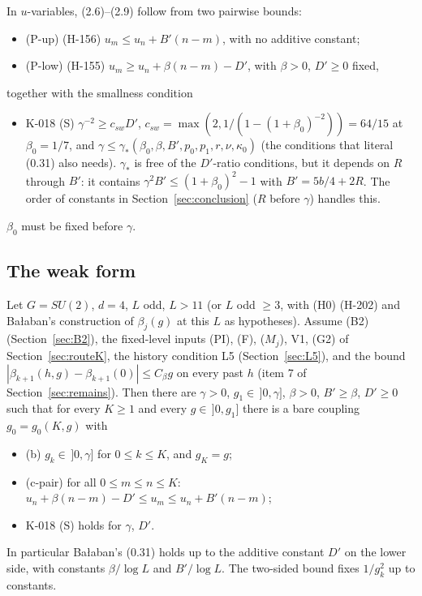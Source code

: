 In $u$-variables, (2.6)--(2.9) follow from two pairwise bounds:
\begin{itemize}
\item (P-up) (H-156) $u_m \le u_n + B'(n-m)$, with no additive constant;
\item (P-low) (H-155) $u_m \ge u_n + \beta(n-m) - D'$, with $\beta>0$, $D'\ge 0$ fixed,
\end{itemize}
together with the smallness condition
\begin{itemize}
\item K-018 (S) $\gamma^{-2} \ge c_{sw} D'$, $c_{sw} = \max(2, 1/(1-(1+\beta_0)^{-2})) = 64/15$ at $\beta_0 = 1/7$, and $\gamma \le \gamma_*(\beta_0,\beta,B',p_0,p_1,r,\nu,\kappa_0)$ (the conditions that literal (0.31) also needs). $\gamma_*$ is free of the $D'$-ratio conditions, but it depends on $R$ through $B'$: it contains $\gamma^2B' \le (1+\beta_0)^2 - 1$ with $B' = 5b/4 + 2R$. The order of constants in Section~\ref{sec:conclusion} ($R$ before $\gamma$) handles this.
\end{itemize}
$\beta_0$ must be fixed before $\gamma$.

\subsection{The weak form}\label{sec:2w}

\begin{theorem}\label{thm:L001}
Let $G = SU(2)$, $d=4$, $L$ odd, $L>11$ (or $L$ odd $\ge 3$, with (H0) (H-202) and Ba{\l}aban's construction of $\beta_j(g)$ at this $L$ as hypotheses). Assume (B2) (Section~\ref{sec:B2}), the fixed-level inputs (PI), (F), ($M_j$), V1, (G2) of Section~\ref{sec:routeK}, the history condition L5 (Section~\ref{sec:L5}), and the bound $|\beta_{k+1}(h,g)-\beta_{k+1}(0)|\le C_\beta g$ on every past $h$ (item 7 of Section~\ref{sec:remains}). Then there are $\gamma>0$, $g_1\in\,]0,\gamma]$, $\beta>0$, $B'\ge\beta$, $D'\ge 0$ such that for every $K\ge 1$ and every $g\in\,]0,g_1]$ there is a bare coupling $g_0 = g_0(K,g)$ with
\begin{itemize}
\item (b) $g_k\in\,]0,\gamma]$ for $0\le k\le K$, and $g_K = g$;
\item (c-pair) for all $0\le m\le n\le K$: $u_n + \beta(n-m) - D' \le u_m \le u_n + B'(n-m)$;
\item K-018 (S) holds for $\gamma$, $D'$.
\end{itemize}
In particular Ba{\l}aban's (0.31) holds up to the additive constant $D'$ on the lower side, with constants $\beta/\log L$ and $B'/\log L$. The two-sided bound fixes $1/g_k^2$ up to constants.
\end{theorem}

